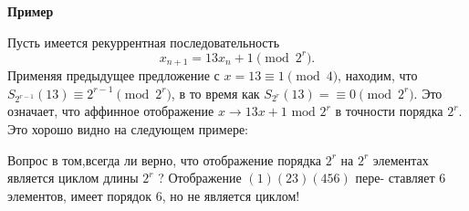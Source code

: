 \documentclass{../template/mai_book}
\begin{document}
\newpage
\noindent\textbf{Пример}

Пусть имеется рекуррентная последовательность
$$x_{n+1} = 13x_n + 1 \pmod{2^r}.$$
Применяя предыдущее предложение с $x = 13 \equiv 1 \pmod{4}$, находим, что\linebreak
$S_{2^{r-1}}(13) \equiv 2^{r - 1} \pmod{2^r}$, в то время как $S_{2^r}(13) =\equiv 0 \pmod{2^r}$. Это\linebreak
означает, что аффинное отображение $x \rightarrow 13x+1 \text{ mod } 2^r$ в точности\linebreak
порядка $2^r$. Это хорошо видно на следующем примере:
\begin{figure}[h]
\end{figure}

Вопрос в том,всегда ли верно, что отображение порядка $2^r$ на $2^r$\linebreak
элементах является циклом длины $2^r$ ? Отображение $(1) (23) (456)$ пере­-\linebreak
ставляет $6$ элементов, имеет порядок $6$, но не является циклом!
\end{document}
